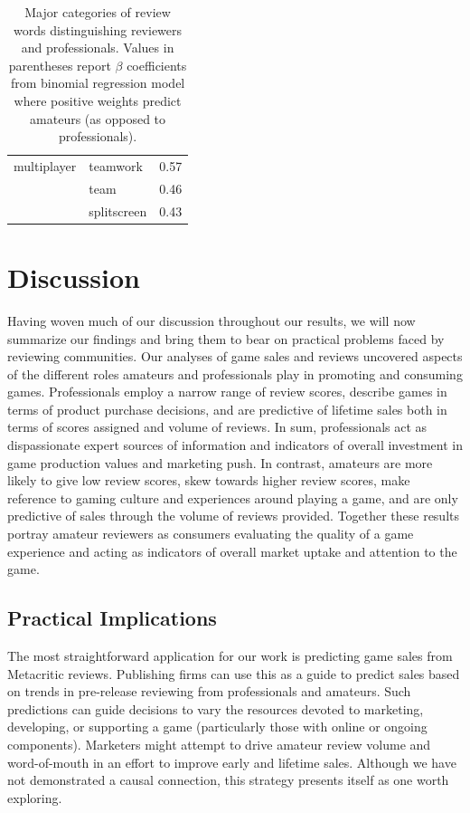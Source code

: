 \documentclass{sig-alternate}
\begin{document}
\begin{table}[tb!]
\begin{tabular}{llc}
\midrule 
multiplayer 
& teamwork & 0.57 \\ 
& team & 0.46 \\ 
& splitscreen & 0.43 \\

\end{tabular}
\caption{Major categories of review words distinguishing reviewers and professionals. Values in parentheses report $\beta$ coefficients from binomial regression model where positive weights predict amateurs (as opposed to professionals).}
\label{tab:user_classification_coef}
\end{table}

\section{Discussion}
Having woven much of our discussion throughout our results, we will
now summarize our findings and bring them to bear on practical problems
faced by reviewing communities. Our analyses of game sales and reviews uncovered aspects of the different roles amateurs and professionals play in promoting and consuming games. Professionals employ a narrow range of review scores, describe games in terms of product purchase decisions, and are predictive of lifetime sales both in terms of scores assigned and volume of reviews. In sum, professionals act as dispassionate expert sources of information and indicators of overall investment in game production values and marketing push. In contrast, amateurs are more likely to give low review scores, skew towards higher review scores, make reference to gaming culture and experiences around playing a game, and are only predictive of sales through the volume of reviews provided. Together these results portray amateur reviewers as consumers evaluating the quality of a game experience and acting as indicators of overall market uptake and attention to the game.


\subsection{Practical Implications}
The most straightforward application for our work is predicting game sales from Metacritic reviews. Publishing firms can use this as a guide to predict sales based on trends in pre-release reviewing from professionals and amateurs. Such predictions can guide decisions to vary the resources devoted to marketing, developing, or supporting a game (particularly those with online or ongoing components). Marketers might attempt to drive amateur review volume and word-of-mouth in an effort to improve early and lifetime sales. Although we have not demonstrated a causal connection, this strategy presents itself as one worth exploring.
\end{document}
